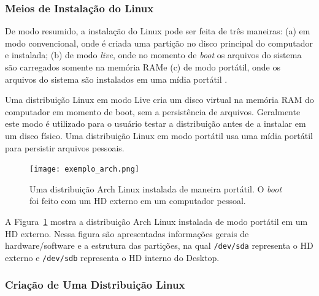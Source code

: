 \documentclass[
article,			%
12pt,				%
openright,			%
oneside,			%
a4paper,			%
chapter=TITLE,		%
section=TITLE,		%
subsection=TITLE,	%
subsubsection=TITLE,%
subsubsubsection=TITLE, %
english,			%
brazil,				%
]{abntex2}
\def\code#1{\texttt{#1}}
\begin{document}
\subsubsection{Meios de Instalação do Linux}

De modo resumido, a instalação do Linux pode ser feita de três
maneiras: (a) em modo convencional, onde é criada uma partição no
disco principal do computador e instalada; (b) de modo \emph{live},
onde no momento de \emph{boot} os arquivos do sistema são carregados
somente na memória RAM\@ e (c) de modo portátil, onde os arquivos do
sistema são instalados em uma mídia portátil \cite{Nunes2009}.


Uma distribuição Linux em modo Live cria um disco virtual na memória
RAM do computador em momento de boot, sem a persistência de arquivos.
Geralmente este modo é utilizado para o usuário testar a distribuição
antes de a instalar em um disco físico. Uma distribuição Linux em modo
portátil usa uma mídia portátil para persistir arquivos pessoais.

\begin{figure}[H]
    \caption{\label{fig:exemplo-distro}Uma distribuição Arch Linux
        instalada de maneira portátil. O \emph{boot} foi feito com um HD
    externo em um computador pessoal.}
    \begin{center}
        \texttt{[image: exemplo\_arch.png]}
    \end{center}
\end{figure}

A Figura~\ref{fig:exemplo-distro} mostra a distribuição Arch Linux
instalada de modo portátil em um HD externo. Nessa figura são
apresentadas informações gerais de hardware/software e a
estrutura das partições, na qual \code{/dev/sda} representa o HD
externo e \code{/dev/sdb} representa o HD interno do Desktop.

\subsubsection{Criação de Uma Distribuição Linux}
\end{document}

